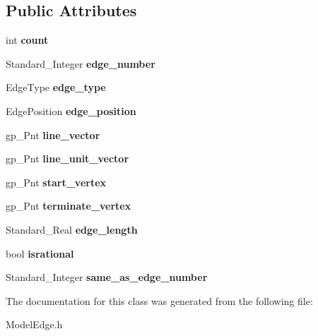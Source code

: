 \subsection*{Public Attributes}
\begin{DoxyCompactItemize}
\item 
\hypertarget{classModelEdge_a16c9c6d7fed7e4b605af19d75303b49f}{int {\bfseries count}}\label{classModelEdge_a16c9c6d7fed7e4b605af19d75303b49f}

\item 
\hypertarget{classModelEdge_a2b3178c1328aab725d2b788944ba59eb}{Standard\-\_\-\-Integer {\bfseries edge\-\_\-number}}\label{classModelEdge_a2b3178c1328aab725d2b788944ba59eb}

\item 
\hypertarget{classModelEdge_ace75c9b1b2a9f48687a706cecdcd6421}{Edge\-Type {\bfseries edge\-\_\-type}}\label{classModelEdge_ace75c9b1b2a9f48687a706cecdcd6421}

\item 
\hypertarget{classModelEdge_a84288312bd23387a2e58dafbccba747a}{Edge\-Position {\bfseries edge\-\_\-position}}\label{classModelEdge_a84288312bd23387a2e58dafbccba747a}

\item 
\hypertarget{classModelEdge_a7f84cbd7c08233e9bff4daf5fef6e2f2}{gp\-\_\-\-Pnt {\bfseries line\-\_\-vector}}\label{classModelEdge_a7f84cbd7c08233e9bff4daf5fef6e2f2}

\item 
\hypertarget{classModelEdge_a6781992388ba080fa9587e333d7e7175}{gp\-\_\-\-Pnt {\bfseries line\-\_\-unit\-\_\-vector}}\label{classModelEdge_a6781992388ba080fa9587e333d7e7175}

\item 
\hypertarget{classModelEdge_a8773f669ad2b8a4f48ba4e021eaada46}{gp\-\_\-\-Pnt {\bfseries start\-\_\-vertex}}\label{classModelEdge_a8773f669ad2b8a4f48ba4e021eaada46}

\item 
\hypertarget{classModelEdge_a12c482570889cdbb3ec93f8c1bade66b}{gp\-\_\-\-Pnt {\bfseries terminate\-\_\-vertex}}\label{classModelEdge_a12c482570889cdbb3ec93f8c1bade66b}

\item 
\hypertarget{classModelEdge_ac4bbc24ad8305422b45c30cd4044d46f}{Standard\-\_\-\-Real {\bfseries edge\-\_\-length}}\label{classModelEdge_ac4bbc24ad8305422b45c30cd4044d46f}

\item 
\hypertarget{classModelEdge_a8d846f8085eb4cc662932a930472585a}{bool {\bfseries isrational}}\label{classModelEdge_a8d846f8085eb4cc662932a930472585a}

\item 
\hypertarget{classModelEdge_a5a0a8c9fdb9463e0aeb9cf98631c5665}{Standard\-\_\-\-Integer {\bfseries same\-\_\-as\-\_\-edge\-\_\-number}}\label{classModelEdge_a5a0a8c9fdb9463e0aeb9cf98631c5665}

\end{DoxyCompactItemize}


The documentation for this class was generated from the following file\-:\begin{DoxyCompactItemize}
\item 
Model\-Edge.\-h\end{DoxyCompactItemize}
